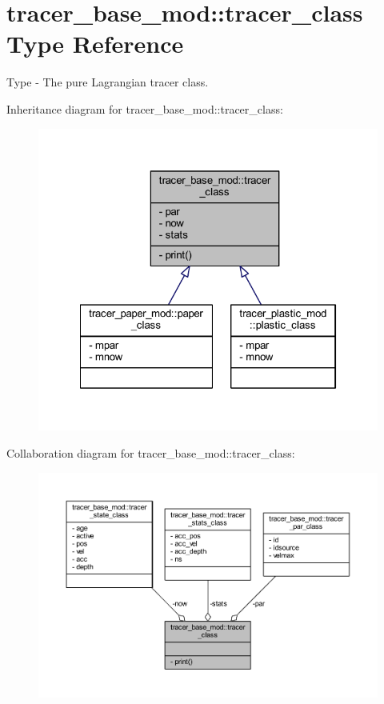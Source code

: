 \hypertarget{structtracer__base__mod_1_1tracer__class}{}\section{tracer\+\_\+base\+\_\+mod\+:\+:tracer\+\_\+class Type Reference}
\label{structtracer__base__mod_1_1tracer__class}


Type -\/ The pure Lagrangian tracer class.  




Inheritance diagram for tracer\+\_\+base\+\_\+mod\+:\+:tracer\+\_\+class\+:
\nopagebreak
\begin{figure}[H]
\begin{center}
\leavevmode
\includegraphics[width=322pt]{structtracer__base__mod_1_1tracer__class__inherit__graph}
\end{center}
\end{figure}


Collaboration diagram for tracer\+\_\+base\+\_\+mod\+:\+:tracer\+\_\+class\+:\nopagebreak
\begin{figure}[H]
\begin{center}
\leavevmode
\includegraphics[width=350pt]{structtracer__base__mod_1_1tracer__class__coll__graph}
\end{center}
\end{figure}
